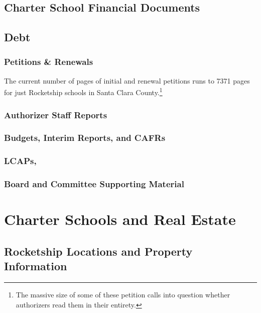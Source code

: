 \subsection{Charter School Financial Documents}\label{sec:findings-charter-financial-docs}\indent

\subsection{Debt}\label{sec:debt}\indent

\subsubsection{Petitions \& Renewals}\label{sec:petitions-renewals}\indent

The current number of pages of initial and renewal petitions runs to 7371 pages for just Rocketship schools in Santa Clara County.\footnote{The massive size of some of these petition calls into question whether authorizers read them in their entirety.}

\subsubsection{Authorizer Staff Reports}\label{sec:findings-authorizer-staff-reports}\indent

\subsubsection{Budgets, Interim Reports, and CAFRs}\label{sec:findings-budgets-etc}\indent

\subsubsection{LCAPs,}\label{sec:findings-lcaps}\indent

\subsubsection{Board and Committee Supporting Material}\label{sec:findings-board-material}\indent

\section{Charter Schools and Real Estate}\label{sec:findings-charter-real-estate}\indent

\subsection{Rocketship Locations and Property Information}\label{sec:location-and-property-info}\indent

